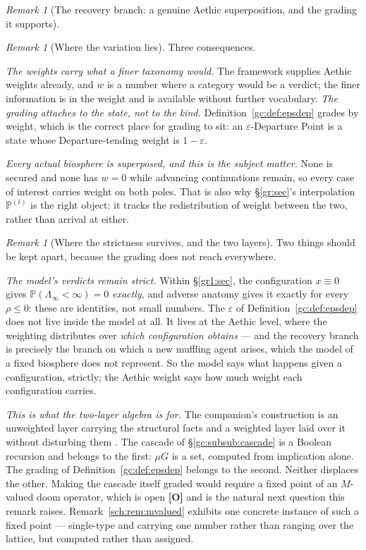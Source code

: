 \documentclass[11pt]{article}
\numberwithin{equation}{section}
\theoremstyle{plain}
\theoremstyle{definition}
\theoremstyle{remark}
\newtheorem{remark}[theorem]{Remark}
\newcommand{\PP}{\mathbb{P}}
\begin{document}
\begin{remark}[The recovery branch: a genuine Aethic superposition,
and the grading it supports]
\begin{remark}[Where the variation lies]
Three consequences.

\emph{The weights carry what a finer taxonomy would.} The framework
supplies Aethic weights already, and $w$ is a number where a category
would be a verdict; the finer information is in the weight and is
available without further vocabulary. \emph{The grading attaches to the state, not to the kind.}
Definition~\ref{gc:def:epsdep} grades by weight, which is the correct
place for grading to sit: an $\varepsilon$-Departure Point is a state
whose Departure-tending weight is $1-\varepsilon$.

\emph{Every actual biosphere is superposed, and this is the subject
matter.} None is secured and none has $w=0$ while advancing
continuations remain, so every case of interest carries weight on both
poles. That is also why \S\ref{gr:sec}'s interpolation $\PP^{(t)}$ is
the right object: it tracks the redistribution of weight between the
two, rather than arrival at either.
\end{remark}

\begin{remark}[Where the strictness survives, and the two layers]
\label{gc:rem:twolayers}
Two things should be kept apart, because the grading does not reach
everywhere.

\emph{The model's verdicts remain strict.} Within \S\ref{gr1:sec}, the
configuration $x\equiv0$ gives $\PP(\Lambda_\infty<\infty)=0$
\emph{exactly}, and adverse anatomy gives it exactly for every
$\rho\le0$: these are identities, not small numbers. The $\varepsilon$
of Definition~\ref{gc:def:epsdep} does not live inside the model at
all. It lives at the Aethic level, where the weighting distributes over
\emph{which configuration obtains} --- and the recovery branch is
precisely the branch on which a new muffling agent arises, which the
model of a fixed biosphere does not represent. So the model says what
happens given a configuration, strictly; the Aethic weight says how
much weight each configuration carries.

\emph{This is what the two-layer algebra is for.} The companion's
construction is an unweighted layer carrying the structural facts and a
weighted layer laid over it without disturbing them
\cite{WeightAlg}. The cascade of \S\ref{gc:subsub:cascade} is a Boolean
recursion and belongs to the first: $\mu G$ is a set, computed from
implication alone. The grading of
Definition~\ref{gc:def:epsdep} belongs to the second. Neither
displaces the other. Making the cascade itself graded would require a
fixed point of an $M$-valued doom operator, which is open \textbf{[O]}
and is the natural next question this remark raises.
Remark~\ref{sch:rem:mvalued} exhibits one concrete instance of such a
fixed point --- single-type and carrying one number rather than ranging
over the lattice, but computed rather than assigned.
\end{remark}
\end{remark}
\end{document}
